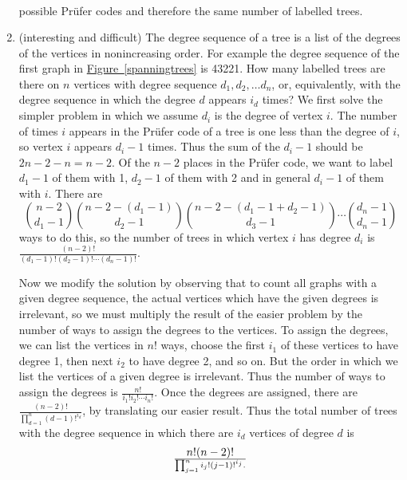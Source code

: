 \documentclass[10pt,]{book}
\theoremstyle{plain}
\theoremstyle{definition}
\numberwithin{equation}{chapter}
\begin{document}
\begin{enumerate}
\begin{align*}
\end{align*}
possible Prüfer codes and therefore the same number of labelled trees.%
%
\item\hypertarget{li-48}{}(interesting and difficult) The degree sequence of a tree is a list of the degrees of the vertices in nonincreasing order.  For example the degree sequence of the first graph in \hyperref[spanningtrees]{Figure~\ref{spanningtrees}} is 43221.  How many labelled trees are there on \(n\) vertices with degree sequence \(d_1,d_2,\ldots d_n\), or, equivalently, with the degree sequence in which the degree \(d\) appears \(i_d\) times? We first solve the simpler problem in which we assume \(d_i\) is the degree of vertex \(i\). The number of times \(i\) appears in the Prüfer code of a tree is one less than the degree of \(i\), so vertex \(i\) appears \(d_i-1\) times. Thus the sum of the \(d_i-1\) should be \(2n-2-n=n-2\). Of the \(n-2\) places in the Prüfer code, we want to label \(d_1-1\) of them with 1, \(d_2-1\) of them with 2 and in general \(d_i-1\) of them with \(i\). There are%
\begin{equation*}
\binom{n-2}{d_1-1}\binom{n-2-(d_1-1)}{d_2-1}\binom{n-2-(d_1-1+d_2-1)}{d_3-1}\cdots\binom{d_n-1}{d_n-1}
\end{equation*}
ways to do this, so the number of trees in which vertex \(i\) has degree \(d_i\) is \(\frac{(n-2)!}{(d_1-1)!(d_2-1)!\cdots(d_n-1)!}\).%
\par
Now we modify the solution by observing that to count all graphs with a given degree sequence, the actual vertices which have the given degrees is irrelevant, so we must multiply the result of the easier problem by the number of ways to assign the degrees to the vertices. To assign the degrees, we can list the vertices in \(n!\) ways, choose the first \(i_1\) of these vertices to have degree 1, then next \(i_2\) to have degree 2, and so on. But the order in which we list the vertices of a given degree is irrelevant. Thus the number of ways to assign the degrees is \(\frac{n!}{i_1!i_2!\cdots i_n!}\). Once the degrees are assigned, there are \(\frac{(n-2)!}{\prod_{d=1}^n (d-1)!^{i_d}}\), by translating our easier result. Thus the total number of trees with the degree sequence in which there are \(i_d\) vertices of degree \(d\) is%
\begin{equation*}
n!(n-2)!\over\prod_{j=1}^n i_j!(j-1)!^{i_j}.
\end{equation*}
%
%
\end{enumerate}
\typeout{************************************************}
\typeout{************************************************}
\end{document}
